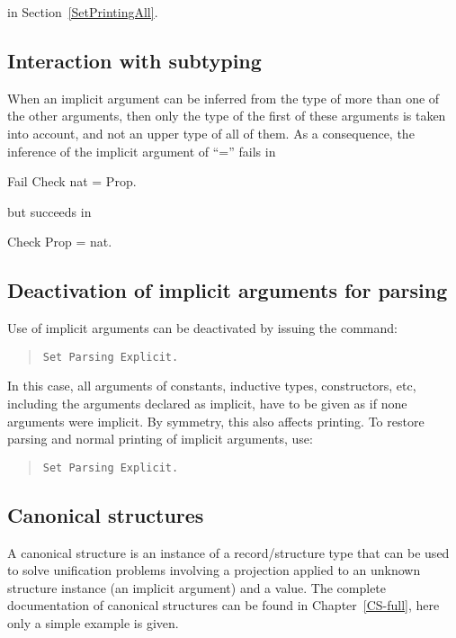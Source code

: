  in Section~\ref{SetPrintingAll}.

\subsection{Interaction with subtyping}

When an implicit argument can be inferred from the type of more than
one of the other arguments, then only the type of the first of these
arguments is taken into account, and not an upper type of all of
them.  As a consequence, the inference of the implicit argument of
``='' fails in
\begin{coq_example*}
Fail Check nat = Prop.
\end{coq_example*}

but succeeds in
\begin{coq_example*}
Check Prop = nat.
\end{coq_example*}

\subsection{Deactivation of implicit arguments for parsing}

Use of implicit arguments can be deactivated by issuing the command:
\begin{quote}
{\tt Set Parsing Explicit.}
\end{quote}

In this case, all arguments of constants, inductive types,
constructors, etc, including the arguments declared as implicit, have
to be given as if none arguments were implicit. By symmetry, this also
affects printing. To restore parsing and normal printing of implicit
arguments, use:
\begin{quote}
{\tt Set Parsing Explicit.}
\end{quote}

\subsection{Canonical structures
}

A canonical structure is an instance of a record/structure type that
can be used to solve unification problems involving a projection
applied to an unknown structure instance (an implicit argument) and
a value.  The complete documentation of canonical structures can be found
in Chapter~\ref{CS-full}, here only a simple example is given.

